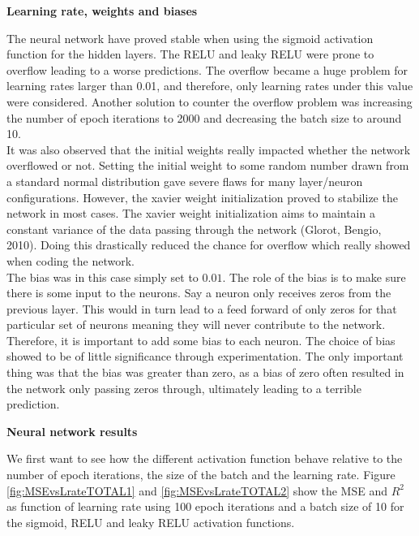 \documentclass[12pt,a4paper]{article}
\begin{document}
\begin{center}
\large{\textbf{Learning rate, weights and biases}}
\end{center}

\noindent The neural network have proved stable when using the sigmoid activation function for the hidden layers. The RELU and leaky RELU were prone to overflow leading to a worse predictions. The overflow became a huge problem for learning rates larger than 0.01, and therefore, only learning rates under this value were considered. Another solution to counter the overflow problem was increasing the number of epoch iterations to 2000 and decreasing the batch size to around 10. 
\\
It was also observed that the initial weights really impacted whether the network overflowed or not. Setting the initial weight to some random number drawn from a standard normal distribution gave severe flaws for many layer/neuron configurations. However, the xavier weight initialization proved to stabilize the network in most cases. The xavier weight initialization aims to maintain a constant variance of the data passing through the network (Glorot, Bengio, 2010). Doing this drastically reduced the chance for overflow which really showed when coding the network.
\\
The bias was in this case simply set to $0.01$. The role of the bias is to make sure there is some input to the neurons. Say a neuron only receives zeros from the previous layer. This would in turn lead to a feed forward of only zeros for that particular set of neurons meaning they will never contribute to the network. Therefore, it is important to add some bias to each neuron. The choice of bias showed to be of little significance through experimentation. The only important thing was that the bias was greater than zero, as a bias of zero often resulted in the network only passing zeros through, ultimately leading to a terrible prediction.

\begin{center}
\large{\textbf{Neural network results}}
\end{center}

\noindent We first want to see how the different activation function behave relative to the number of epoch iterations, the size of the batch and the learning rate. Figure \ref{fig:MSEvsLrateTOTAL1} and \ref{fig:MSEvsLrateTOTAL2} show the MSE and $R^2$ as function of learning rate using 100 epoch iterations and a batch size of 10 for the sigmoid, RELU and leaky RELU activation functions.
\end{document}
